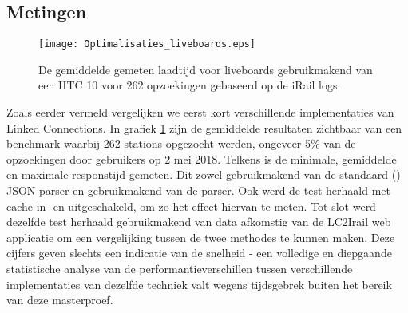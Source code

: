 \subsection{Metingen}
\begin{figure}[h]
	\centering
	\texttt{[image: Optimalisaties\_liveboards.eps]}
		\caption[Gemeten laadtijd liveboards]{De gemiddelde gemeten laadtijd voor liveboards gebruikmakend van een HTC 10 voor 262 opzoekingen gebaseerd op de iRail logs. }
	\label{fig:liveboardlabtest}
\end{figure}
%		

Zoals eerder vermeld vergelijken we eerst kort verschillende implementaties van Linked Connections. In grafiek \ref{fig:liveboardlabtest} zijn de gemiddelde resultaten zichtbaar van een benchmark waarbij 262 stations opgezocht werden, ongeveer 5\% van de opzoekingen door gebruikers op 2 mei 2018. Telkens is de minimale, gemiddelde en maximale responstijd gemeten. Dit zowel gebruikmakend van de standaard () JSON parser en gebruikmakend van de  parser. Ook werd de test herhaald met cache in- en uitgeschakeld, om zo het effect hiervan te meten. Tot slot werd dezelfde test herhaald gebruikmakend van data afkomstig van de LC2Irail web applicatie om een vergelijking tussen de twee methodes te kunnen maken. Deze cijfers geven slechts een indicatie van de snelheid - een volledige en diepgaande statistische analyse van de performantieverschillen tussen verschillende implementaties van dezelfde techniek valt wegens tijdsgebrek buiten het bereik van deze masterproef.

